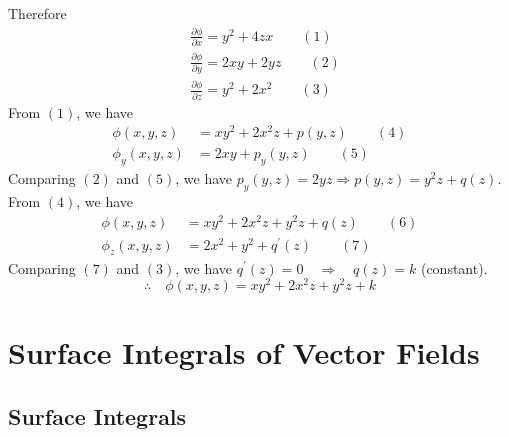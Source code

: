\documentclass[11pt, a4paper]{MATH2023}
\begin{document}
\begin{spacing}{1.3}
    Therefore
    $$\begin{aligned}
    &\frac{\partial \phi}{\partial x}=y^{2}+4 z x \qquad (1)\\
    &\frac{\partial \phi}{\partial y}=2 x y+2 y z \qquad (2)\\
    &\frac{\partial \phi}{\partial z}=y^{2}+2 x^{2} \qquad (3)
    \end{aligned}$$
    From $(1)$, we have
    $$\begin{aligned}
    \phi(x, y, z) &=x y^{2}+2 x^{2} z+p(y, z) \qquad (4)\\
    \phi_{y}(x, y, z) &=2 x y+p_{y}(y, z) \qquad (5)
    \end{aligned}$$
    Comparing $(2)$ and $(5)$, we have $p_{y}(y, z)=2 y z \Rightarrow p(y, z)=y^{2} z+q(z) .$ From $(4)$, we have
    $$\begin{aligned}
    \phi(x, y, z) &=x y^{2}+2 x^{2} z+y^{2} z+q(z) \qquad(6)\\
    \phi_{z}(x, y, z) &=2 x^{2}+y^{2}+q^{\prime}(z) \qquad(7)
    \end{aligned}$$
    Comparing $(7)$ and $(3)$, we have $q^{\prime}(z)=0 \quad \Rightarrow \quad q(z)=k$ (constant).
    $$\therefore \quad \phi(x, y, z)=x y^{2}+2 x^{2} z+y^{2} z+k$$

    \newpage
    \section{Surface Integrals of Vector Fields}
    \subsection{Surface Integrals}


\end{spacing}
\end{document}
